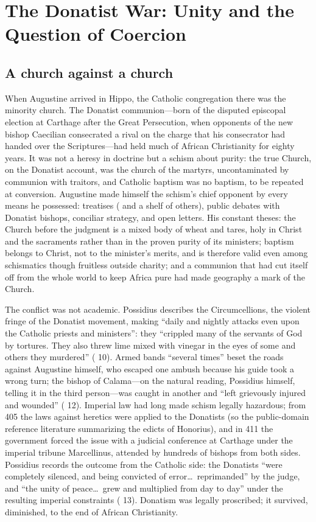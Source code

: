 \section{The Donatist War: Unity and the Question of Coercion}

\subsection{A church against a church}

When Augustine arrived in Hippo, the Catholic congregation there was the
minority church. The Donatist communion---born of the disputed episcopal
election at Carthage after the Great Persecution, when opponents of the new
bishop Caecilian consecrated a rival on the charge that his consecrator had
handed over the Scriptures---had held much of African Christianity for
eighty years. It was not a heresy in doctrine but a schism about purity: the
true Church, on the Donatist account, was the church of the martyrs, uncontaminated
by communion with traitors, and Catholic baptism was no baptism, to be
repeated at conversion. Augustine made himself the schism's chief opponent
by every means he possessed: treatises ( and a shelf of others), public debates with Donatist bishops,
conciliar strategy, and open letters. His constant theses: the Church before
the judgment is a mixed body
of wheat and tares, holy in Christ and the sacraments rather than in the
proven purity of its ministers; baptism belongs to Christ, not to the
minister's merits, and is therefore valid even among schismatics though
fruitless outside charity; and a communion that had cut itself off from the
whole world to keep Africa pure had made geography a mark of the Church.

The conflict was not academic. Possidius describes the Circumcellions, the
violent fringe of the Donatist movement, making ``daily and nightly attacks
even upon the Catholic priests and ministers'': they ``crippled many of the
servants of God by tortures. They also threw lime mixed with vinegar in the
eyes of some and others they murdered'' ( 10). Armed bands
``several times'' beset the roads against Augustine himself, who escaped
one ambush because his guide took a wrong turn; the bishop of Calama---on
the natural reading, Possidius himself, telling it in the third person---was
caught in another and ``left grievously injured and wounded''
( 12). Imperial law had long made schism legally hazardous; from
405 the laws against heretics were applied to the Donatists (so the
public-domain reference literature summarizing the edicts of Honorius), and
in 411 the government forced the issue with a judicial conference at
Carthage under the imperial tribune Marcellinus,
attended by hundreds of bishops from both sides. Possidius records the
outcome from the Catholic side: the Donatists ``were completely silenced,
and being convicted of error\ldots\ reprimanded'' by the judge, and ``the
unity of peace\ldots\ grew and multiplied from day to day'' under the
resulting imperial constraints ( 13). Donatism was legally
proscribed; it survived, diminished, to the end of African Christianity.

